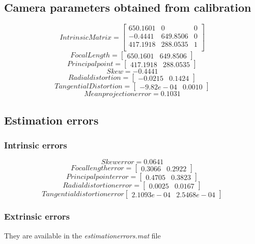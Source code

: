 \documentclass[11pt,a4paper]{article}
\begin{document}
				\subsection{Camera parameters obtained from calibration}
				\[ 
				Intrinsic Matrix =
				\begin{bmatrix}
				650.1601 & 0 & 0 \\
				-0.4441 & 649.8506 & 0 \\
				417.1918 & 288.0535 & 1 \\
				\end{bmatrix}
				\]
				\[ 
				Focal Length =
				\begin{bmatrix}
				650.1601 & 649.8506
				\end{bmatrix}
				\]
				\[ 
				Principal point =
				\begin{bmatrix}
				417.1918 & 288.0535
				\end{bmatrix}
				\]
				\[ 
				Skew = -0.4441
				\]
				\[
				Radial distortion = 
				\begin{bmatrix}
				-0.0215 & 0.1424
				\end{bmatrix}
				\]
				\[ 
				Tangential Distortion = 
				\begin{bmatrix}
				-9.82e-04 & 0.0010
				\end{bmatrix}
				\]
				\[ 
				Mean projection error = 0.1031
				\]
				\subsection{Estimation errors}
				\subsubsection{Intrinsic errors}
				\[
				Skew error = 0.0641
				\]
				\[
				Focal length error = 
				\begin{bmatrix}
				0.3066 & 0.2922
				\end{bmatrix}
				\]
				\[
				Principal point error = 
				\begin{bmatrix}
				0.4705 & 0.3823
				\end{bmatrix}
				\]
				\[
				Radial distortion error = 
				\begin{bmatrix}
				0.0025 & 0.0167
				\end{bmatrix}
				\]
				\[
				Tangential distortion error
				\begin{bmatrix}
				2.1093e-04 & 2.5468e-04
				\end{bmatrix}
				\]
				\subsubsection{Extrinsic errors}
				They are available in the \textit{estimationerrors.mat} file
				
\end{document}
